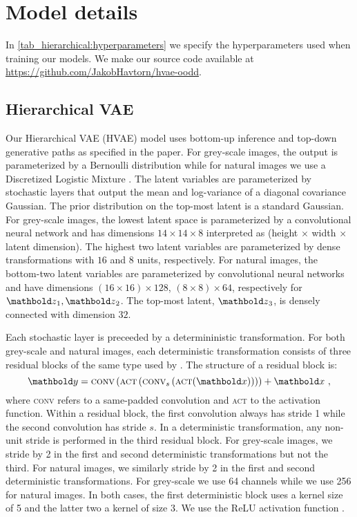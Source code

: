 {\section{Model details}\label{sec:model-details}
In \cref{tab_hierarchical:hyperparameters} we specify the hyperparameters used when training our models.
We make our source code available at \url{https://github.com/JakobHavtorn/hvae-oodd}.

\subsection{Hierarchical VAE}
Our Hierarchical VAE (HVAE) model uses bottom-up inference and top-down generative paths as specified in the paper.
For grey-scale images, the output is parameterized by a Bernoulli distribution while for natural images we use a Discretized Logistic Mixture \cite{salimans_pixelcnn_2017}.
The latent variables are parameterized by stochastic layers that output the mean and log-variance of a diagonal covariance Gaussian. The prior distribution on the top-most latent is a standard Gaussian.
For grey-scale images, the lowest latent space is parameterized by a convolutional neural network and has dimensions $14\times14\times8$ interpreted as (height $\times$ width $\times$ latent dimension). The highest two latent variables are parameterized by dense transformations with $16$ and $8$ units, respectively.
For natural images, the bottom-two latent variables are parameterized by convolutional neural networks and have dimensions $(16\times16)\times128$, $(8\times8)\times64$, respectively for $\zb_1, \zb_2$. The top-most latent, $\zb_3$, is densely connected with dimension $32$.

Each stochastic layer is preceeded by a determininistic transformation.
For both grey-scale and natural images, each deterministic transformation consists of three residual blocks of the same type used by \textcite{maaloe_biva_2019}. The structure of a residual block is:
\begin{equation}
    \yb = \textsc{conv}\left( \textsc{act} \left( \textsc{conv}_s \left( \textsc{act}(\xb) \right) \right) \right) + \xb \ ,
\end{equation}
where \textsc{conv} refers to a same-padded convolution and \textsc{act} to the activation function. Within a residual block, the first convolution always has stride 1 while the second convolution has stride $s$. In a deterministic transformation, any non-unit stride is performed in the third residual block. For grey-scale images, we stride by 2 in the first and second deterministic transformations but not the third. For natural images, we similarly stride by 2 in the first and second deterministic transformations. For grey-scale we use 64 channels while we use 256 for natural images.
In both cases, the first deterministic block uses a kernel size of 5 and the latter two a kernel of size 3. We use the ReLU activation function \cite{fukushima_neocognitron_1980, nair_rectified_2010}.

}
